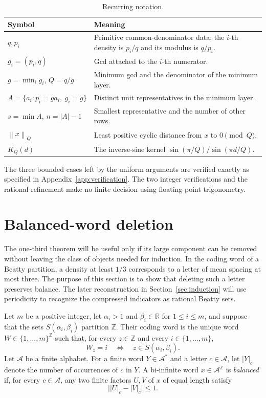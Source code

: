 \documentclass[11pt]{article}
\theoremstyle{definition}
\theoremstyle{remark}
\newcommand{\Z}{\mathbb Z}
\newcommand{\normQ}[1]{\left\lVert #1\right\rVert_Q}
\begin{document}
\begin{table}[ht]
\centering
\small
\begin{tabularx}{\textwidth}{@{}p{}X@{}}
\toprule
Symbol & Meaning \\
\midrule
\(q,p_i\) & Primitive common-denominator data; the \(i\)-th density is
\(p_i/q\) and its modulus is \(q/p_i\).\\
\(g_i=(p_i,q)\) & Gcd attached to the \(i\)-th numerator.\\
\(g=\min_i g_i\), \(Q=q/g\) & Minimum gcd and the denominator of the
minimum layer.\\
\(A=\{a_i:p_i=ga_i,\ g_i=g\}\) & Distinct unit representatives in the
minimum layer.\\
\(s=\min A\), \(n=|A|-1\) & Smallest representative and the number of
other rows.\\
\(\normQ{x}\) & Least positive cyclic distance from \(x\) to
\(0\pmod Q\).\\
\(K_Q(d)\) & The inverse-sine kernel
\(\sin(\pi/Q)/\sin(\pi d/Q)\).\\
\bottomrule
\end{tabularx}
\caption{Recurring notation.}
\label{tab:notation}
\end{table}

The three bounded cases left by the uniform arguments are verified exactly as
specified in Appendix~\ref{app:verification}.  The two integer verifications
and the rational refinement make no finite decision using floating-point
trigonometry.

\section{Balanced-word deletion}\label{sec:deletion}

The one-third theorem will be useful only if its large component can be
removed without leaving the class of objects needed for induction.  In the
coding word of a Beatty partition, a density at least \(1/3\) corresponds to
a letter of mean spacing at most three.  The purpose of this section is to
show that deleting such a letter preserves balance.  The later reconstruction
in Section~\ref{sec:induction} will use periodicity to recognize the
compressed indicators as rational Beatty sets.

Let \(m\) be a positive integer, let \(\alpha_i>1\) and
\(\beta_i\in\mathbb R\) for \(1\le i\le m\), and suppose that the sets
\(S(\alpha_i,\beta_i)\) partition \(\Z\).  Their coding word is the unique
word \(W\in\{1,\ldots,m\}^{\Z}\) such that, for every \(z\in\Z\) and
every \(i\in\{1,\ldots,m\}\),
\[
 W_z=i\quad\Longleftrightarrow\quad z\in S(\alpha_i,\beta_i).
\]
Let \(\mathcal A\) be a finite alphabet.  For a finite word
\(Y\in\mathcal A^*\) and a letter \(c\in\mathcal A\), let \(|Y|_c\)
denote the number of occurrences of \(c\) in \(Y\).  A bi-infinite word
\(x\in\mathcal A^{\Z}\) is \emph{balanced} if, for every
\(c\in\mathcal A\), any two finite factors \(U,V\) of \(x\) of equal
length satisfy
\[
 \bigl||U|_c-|V|_c\bigr|\le1.
\]
\end{document}
